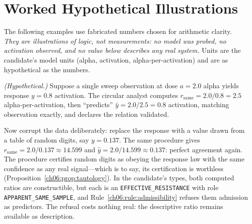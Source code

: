 \section{Worked Hypothetical Illustrations}\label{ch06:illustrations}

The following examples use fabricated numbers chosen for arithmetic
clarity. \emph{They are illustrations of logic, not measurements: no model
was probed, no activation observed, and no value below describes any real
system.} Units are the candidate's model units (alpha, activation,
alpha-per-activation) and are as hypothetical as the numbers.

\begin{example}\label{ch06:ex:circular}
\emph{(Hypothetical.)} Suppose a single sweep observation at dose
$a = 2.0$ alpha yields response $y = 0.8$ activation. The circular analyst
computes $r_{\mathrm{same}} = 2.0 / 0.8 = 2.5$ alpha-per-activation, then
``predicts'' $\hat y = 2.0 / 2.5 = 0.8$ activation, matching observation
exactly, and declares the relation validated.

Now corrupt the data deliberately: replace the response with a value drawn
from a table of random digits, say $y = 0.137$. The same procedure gives
$r_{\mathrm{same}} = 2.0 / 0.137 \approx 14.599$ and
$\hat y = 2.0 / 14.599 \approx 0.137$: perfect agreement again. The
procedure certifies random digits as obeying the response law with the
same confidence as any real signal---which is to say, its certification is
worthless (Proposition~\ref{ch06:prop:tautology}). In the candidate's
types, both computed ratios are constructible, but each is an
\texttt{EFFECTIVE\_RESISTANCE} with role
\texttt{APPARENT\_SAME\_SAMPLE}, and Rule~\ref{ch06:rule:admissibility}
refuses them admission as predictors. The refusal costs nothing real: the
descriptive ratio remains available as description.
\end{example}

